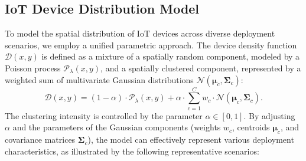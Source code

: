 \documentclass[10pt,conference,letterpaper]{IEEEtran}
\begin{document}
\subsection{IoT Device Distribution Model}
\label{subsec:iot_distribution}

To model the spatial distribution of IoT devices across diverse deployment scenarios, we employ a unified parametric approach. The device density function $\mathcal{D}(x,y)$ is defined as a mixture of a spatially random component, modeled by a Poisson process $\mathcal{P}_\lambda(x,y)$, and a spatially clustered component, represented by a weighted sum of multivariate Gaussian distributions $\mathcal{N}(\mathbf{\mu}_c, \mathbf{\Sigma}_c)$:
\begin{equation}
\mathcal{D}(x,y) = (1-\alpha) \cdot \mathcal{P}_\lambda(x,y) + \alpha \cdot \sum_{c=1}^C w_c \cdot \mathcal{N}(\mathbf{\mu}_c, \mathbf{\Sigma}_c).
\end{equation}
The clustering intensity is controlled by the parameter $\alpha \in [0,1]$. By adjusting $\alpha$ and the parameters of the Gaussian components (weights $w_c$, centroids $\mathbf{\mu}_c$, and covariance matrices $\mathbf{\Sigma}_c$), the model can effectively represent various deployment characteristics, as illustrated by the following representative scenarios:
\end{document}
